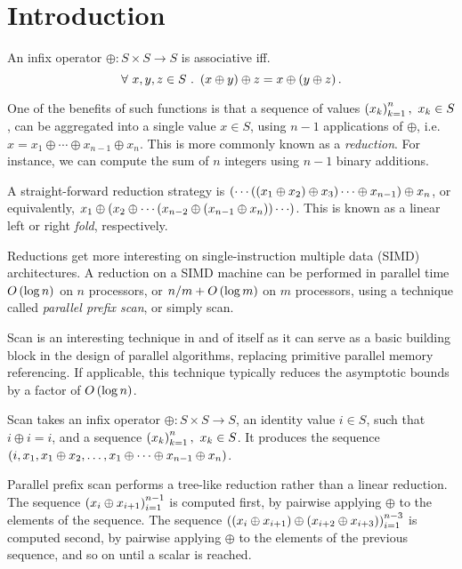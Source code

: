 \section{Introduction}

An infix operator $\oplus:S\times S\rightarrow S$ is associative iff.
\[\forall\ x,y,z\in S\ .\ \p{x \oplus y} \oplus z = x \oplus \p{y \oplus z}.\]

One of the benefits of such functions is that a sequence of values
$\left({x_k}\right)_{k=1}^n,\ x_k\in S$, can be aggregated into a single value $x\in S$,
using $n-1$ applications of $\oplus$, i.e. $x = x_1 \oplus \cdots \oplus
x_{n-1} \oplus x_n$. This is more commonly known as a \emph{reduction}.  For
instance, we can compute the sum of $n$ integers using $n-1$ binary additions.

A straight-forward reduction strategy is $\left({\cdots \left({\left({x_1 \oplus x_2}\right)
\oplus x_3}\right) \cdots \oplus x_{n-1}}\right) \oplus x_n$, or equivalently, $x_1 \oplus
\left({x_2 \oplus \cdots \left({x_{n-2} \oplus \left({x_{n-1} \oplus x_n}\right)}\right) \cdots }\right)$.  This
is known as a linear left or right \emph{fold}, respectively.

Reductions get more interesting on single-instruction multiple data (SIMD)
architectures. A reduction on a SIMD machine can be performed in parallel time
$O\left({\log n}\right)$ on $n$ processors, or ${n/m}+O\left({\log m}\right)$ on $m$ processors,
using a technique called \emph{parallel prefix scan}, or simply scan.

Scan is an interesting technique in and of itself as it can serve as a basic
building block in the design of parallel algorithms, replacing primitive
parallel memory referencing. If applicable, this technique typically reduces
the asymptotic bounds by a factor of $O\left({\log n}\right)$\cite{blelloch}.

Scan takes an infix operator $\oplus:S\times S\rightarrow S$, an identity value
$i\in S$, such that $i\oplus i = i$, and a sequence $\left({x_k}\right)_{k=1}^n,\ x_k\in
S$.  It produces the sequence $\left({i, x_1, x_1 \oplus x_2, \ldots, x_1 \oplus
\cdots \oplus x_{n-1} \oplus x_n}\right)$.

Parallel prefix scan performs a tree-like reduction rather than a linear
reduction. The sequence $\left({x_i \oplus x_{i+1}}\right)_{i=1}^{n-1}$ is computed first,
by pairwise applying $\oplus$ to the elements of the sequence. The sequence
$\left({\left({x_i \oplus x_{i+1}}\right) \oplus \left({x_{i+2} \oplus x_{i+3}}\right)}\right)_{i=1}^{n-3}$ is
computed second, by pairwise applying $\oplus$ to the elements of the previous
sequence, and so on until a scalar is reached.


